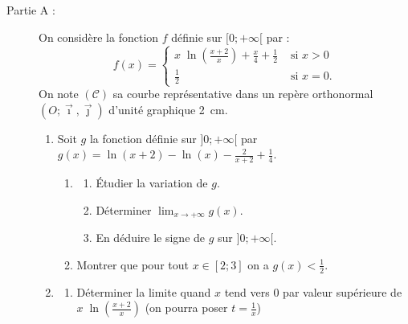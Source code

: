 \begin{exo}
      \begin{description}
            \item[Partie A :]
                  On consid\`ere la fonction $f$ d\'efinie sur $[0 ; +\infty[$ par : 
                  \[
                        f(x) = 
                              \left\lbrace
                              \begin{array}{ll}
                                    x \; \ln \left( \frac{x+2}{x} \right) + \frac{x}{4} + \frac{1}{2} & \text{ si } x > 0 \\
                                    \frac{1}{2} & \text{ si } x = 0.
                              \end{array}
                              \right.
                  \]
                  On note $(\mathscr{C})$ sa courbe repr\'esentative dans un rep\`ere orthonormal $(O ; \vec{\imath} , \vec{\jmath})$ d'unit\'e graphique 2~cm.
                  \begin{enumerate}
                        \item Soit $g$ la fonction d\'efinie sur $]0 ; +\infty[$ par 
                              $g(x) = \ln (x+2) - \ln (x) - \frac{2}{x+2} + \frac{1}{4}$.
                              \begin{enumerate}
                                    \item \begin{enumerate}
                                                \item \'Etudier la variation de $g$.
                                                \item D\'eterminer $\displaystyle{\lim_{x\rightarrow +\infty} g(x)}$.
                                                \item En d\'eduire le signe de $g$ sur $]0 ; +\infty[$.
                                          \end{enumerate}
                                    \item Montrer que pour tout $x \in [ 2 ; 3 ]$ on a $g(x) < \frac{1}{2}$.
                              \end{enumerate}
                        \item \begin{enumerate}
                                    \item D\'eterminer la limite quand $x$ tend vers $0$ par valeur sup\'erieure de
                                          $x \; \ln \left( \frac{x+2}{x} \right)$ (on pourra poser $t = \frac{1}{x}$)

\end{enumerate}
\end{enumerate}
\end{description}
\end{exo}
